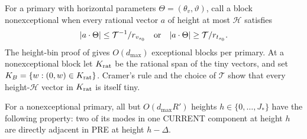 For a primary with horizontal parameters
\(\Theta=(\theta_v,\vartheta)\), call a block nonexceptional when
every rational vector \(a\) of height at most \(\mathcal H\) satisfies
\begin{equation}\label{eq:tiny-huge-b}
 |a\cdot\Theta|\le\mathcal T^{-1}/r_{v_{s_0}}
 \quad\hbox{or}\quad
 |a\cdot\Theta|\ge\mathcal T/r_{t_{s_0}}.
\end{equation}
The height-bin proof of
\cite[Lemma~8.2]{H} gives \(O(d_{\max})\) exceptional blocks per
primary.  At a nonexceptional block let \(K_{\rm rat}\) be the
rational span of the tiny vectors, and set
\(K_B=\{w:(0,w)\in K_{\rm rat}\}\).
Cramer's rule and the choice of \(\mathcal T\) show that every
height-\(\mathcal H\) vector in \(K_{\rm rat}\) is itself tiny.

\begin{lemma}\label{lem:height-b}
For a nonexceptional primary, all but \(O(d_{\max}R')\) heights
\(h\in\{0,\ldots,J_*\}\)
have the following property: two of its modes in one CURRENT
component at height \(h\) are directly adjacent in PRE at height
\(h-\Delta\).
\end{lemma}


